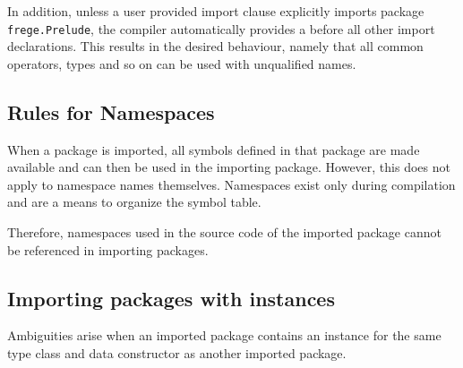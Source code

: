 In addition, unless a user provided import clause explicitly imports package \texttt{frege.Prelude}, the
compiler automatically provides a
before all other import declarations.
This results
in the desired behaviour, namely that all common operators, types and
so on can be used with unqualified names.


\subsection{Rules for Namespaces}

When a package is imported, all symbols defined in that package are made
available and can then be used in the importing package.
However, this does not apply to namespace names themselves. 
Namespaces exist only during compilation and are a means to organize the symbol table.

Therefore, namespaces used in the source code of the imported package
cannot be referenced in importing packages.

\subsection{Importing packages with instances}

Ambiguities arise when an imported package contains an instance for
the same type class and data constructor as another imported package.

